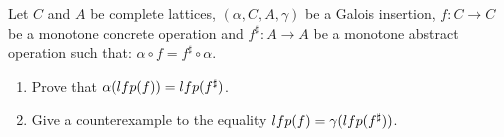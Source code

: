 {Let $C$ and $A$ be complete lattices, $(\alpha, C, A, \gamma)$ be a Galois insertion, $f : C \to C$ be a monotone concrete operation and $f^\sharp : A \to A$
	be a monotone abstract operation such that: $\alpha \circ f = f^\sharp \circ \alpha$.
\begin{enumerate}
	\item Prove that $\alpha(lfp(f )) = lfp(f^\sharp)$.
	\item  Give a counterexample to the equality $lfp(f ) = \gamma(lfp(f^\sharp))$.
\end{enumerate}	
}
{}